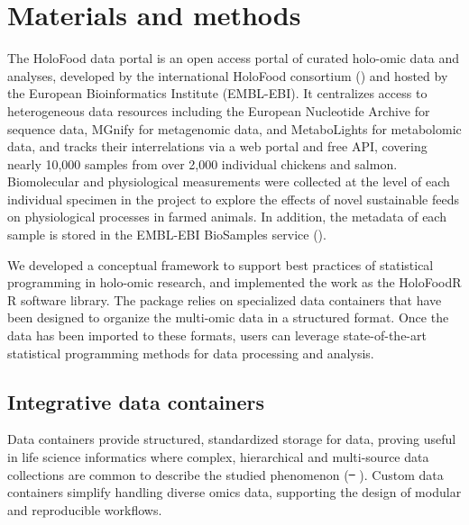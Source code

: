 \documentclass[unnumsec,webpdf,namedate,modern,large]{oup-authoring-template}%
\providecommand{\DIFaddtex}[1]{{\protect\color{blue}\uwave{#1}}} %
\providecommand{\DIFdeltex}[1]{{\protect\color{red}\sout{#1}}}                      %
\providecommand{\DIFaddbegin}{} %
\providecommand{\DIFaddend}{} %
\providecommand{\DIFdelbegin}{} %
\providecommand{\DIFdelend}{} %
\providecommand{\DIFadd}[1]{\texorpdfstring{\DIFaddtex{#1}}{#1}} %
\providecommand{\DIFdel}[1]{\texorpdfstring{\DIFdeltex{#1}}{}} %
\newcommand{\DIFscaledelfig}{0.5}
\newlength{\DIFdelgraphicswidth} %
\newlength{\DIFdelgraphicsheight} %
\newcommand{\DIFaddincludegraphics}[2][]{{\color{blue}\fbox{\DIFOincludegraphics[#1]{#2}}}} %
\newcommand{\DIFdelincludegraphics}[2][]{%
\sbox{\DIFdelgraphicsbox}{\DIFOincludegraphics[#1]{#2}}%
\settoboxwidth{\DIFdelgraphicswidth}{\DIFdelgraphicsbox} %
\settoboxtotalheight{\DIFdelgraphicsheight}{\DIFdelgraphicsbox} %
\scalebox{\DIFscaledelfig}{%
\parbox[b]{\DIFdelgraphicswidth}{\usebox{\DIFdelgraphicsbox}\\[-\baselineskip] \rule{\DIFdelgraphicswidth}{0em}}\llap{\resizebox{\DIFdelgraphicswidth}{\DIFdelgraphicsheight}{%
\setlength{\unitlength}{\DIFdelgraphicswidth}%
\begin{picture}(1,1)%
\thicklines\linethickness{2pt} %
{\color[rgb]{1,0,0}\put(0,0){\framebox(1,1){}}}%
{\color[rgb]{1,0,0}\put(0,0){\line( 1,1){1}}}%
{\color[rgb]{1,0,0}\put(0,1){\line(1,-1){1}}}%
\end{picture}%
}\hspace*{3pt}}} %
} %
\DeclareRobustCommand{\DIFaddbegin}{\DIFOaddbegin \let\includegraphics\DIFaddincludegraphics} %
\DeclareRobustCommand{\DIFaddend}{\DIFOaddend \let\includegraphics\DIFOincludegraphics} %
\DeclareRobustCommand{\DIFdelbegin}{\DIFOdelbegin \let\includegraphics\DIFdelincludegraphics} %
\DeclareRobustCommand{\DIFdelend}{\DIFOaddend \let\includegraphics\DIFOincludegraphics} %
\begin{document}
\section{Materials and methods}

The HoloFood data portal is an open access portal of curated holo-omic data and analyses, developed by the international HoloFood consortium (\cite{rogers_holofood_2025}) and hosted by the European Bioinformatics Institute (EMBL-EBI). It centralizes access to heterogeneous data resources including the European Nucleotide Archive for sequence data, MGnify for metagenomic data, and MetaboLights for metabolomic data, and tracks their interrelations via a web portal and free API, covering nearly 10,000 samples from over 2,000 individual chickens and salmon. Biomolecular and physiological measurements were collected at the level of each individual specimen in the project to explore the effects of novel sustainable feeds on physiological processes in farmed animals. In addition, the metadata of each sample is stored in the EMBL-EBI BioSamples service (\cite{courtot_2018}).

We developed a conceptual framework to support best practices of statistical programming in holo-omic research, and implemented the work as the HoloFoodR R software library. The package relies on specialized data containers that have been designed to organize the multi-omic data in a structured format. Once the data has been imported to these formats, users can leverage state-of-the-art statistical programming methods for data processing and analysis.

\vspace{-1em}
\subsection{Integrative data containers}

Data containers provide structured, standardized storage for data, proving useful in life science informatics where complex, hierarchical and multi-source data collections are common to describe the studied phenomenon (\DIFdelbegin \DIFdel{\mbox{%
\cite{drnevich_2024}}\hskip0pt%
}\DIFdelend \DIFaddbegin \DIFadd{\mbox{%
\cite{drnevich_2025}}\hskip0pt%
}\DIFaddend ). Custom data containers simplify handling diverse omics data, supporting the design of modular and reproducible workflows.
\end{document}
